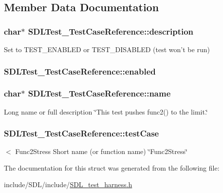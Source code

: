 \subsection{Member Data Documentation}
\hypertarget{struct_s_d_l_test___test_case_reference_a1ee6c8a2529fdfcd62bb1483c26be67d}{
\subsubsection[{description}]{\setlength{\rightskip}{0pt plus 5cm}char$\ast$ S\-D\-L\-Test\-\_\-\-Test\-Case\-Reference\-::description}}\label{struct_s_d_l_test___test_case_reference_a1ee6c8a2529fdfcd62bb1483c26be67d}
Set to T\-E\-S\-T\-\_\-\-E\-N\-A\-B\-L\-E\-D or T\-E\-S\-T\-\_\-\-D\-I\-S\-A\-B\-L\-E\-D (test won't be run) \hypertarget{struct_s_d_l_test___test_case_reference_a15168c85e38cae7557b4beb477ef6f9a}{
\subsubsection[{enabled}]{ S\-D\-L\-Test\-\_\-\-Test\-Case\-Reference\-::enabled}}\label{struct_s_d_l_test___test_case_reference_a15168c85e38cae7557b4beb477ef6f9a}
\hypertarget{struct_s_d_l_test___test_case_reference_aabd588c915c52fb13bcd0c71e071a604}{
\subsubsection[{name}]{\setlength{\rightskip}{0pt plus 5cm}char$\ast$ S\-D\-L\-Test\-\_\-\-Test\-Case\-Reference\-::name}}\label{struct_s_d_l_test___test_case_reference_aabd588c915c52fb13bcd0c71e071a604}
Long name or full description \char`\"{}\-This test pushes func2() to the limit.\char`\"{} \hypertarget{struct_s_d_l_test___test_case_reference_af9472f0c421a2845b540fc28fb30a3ef}{
\subsubsection[{test\-Case}]{ S\-D\-L\-Test\-\_\-\-Test\-Case\-Reference\-::test\-Case}}\label{struct_s_d_l_test___test_case_reference_af9472f0c421a2845b540fc28fb30a3ef}
$<$ Func2\-Stress Short name (or function name) \char`\"{}\-Func2\-Stress\char`\"{} 

The documentation for this struct was generated from the following file\-:\begin{DoxyCompactItemize}
\item 
include/\-S\-D\-L/include/\hyperlink{_s_d_l__test__harness_8h}{S\-D\-L\-\_\-test\-\_\-harness.\-h}\end{DoxyCompactItemize}
